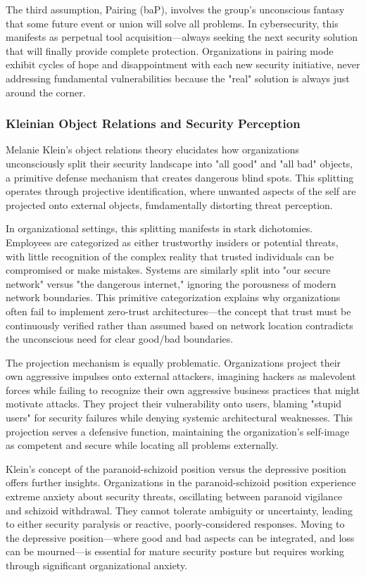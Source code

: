 \documentclass[manuscript,screen,review]{acmart}
\begin{document}
The third assumption, Pairing (baP), involves the group's unconscious fantasy that some future event or union will solve all problems. In cybersecurity, this manifests as perpetual tool acquisition—always seeking the next security solution that will finally provide complete protection. Organizations in pairing mode exhibit cycles of hope and disappointment with each new security initiative, never addressing fundamental vulnerabilities because the "real" solution is always just around the corner.

\subsubsection{Kleinian Object Relations and Security Perception}

Melanie Klein's object relations theory\cite{klein1946} elucidates how organizations unconsciously split their security landscape into "all good" and "all bad" objects, a primitive defense mechanism that creates dangerous blind spots. This splitting operates through projective identification, where unwanted aspects of the self are projected onto external objects, fundamentally distorting threat perception.

In organizational settings, this splitting manifests in stark dichotomies. Employees are categorized as either trustworthy insiders or potential threats, with little recognition of the complex reality that trusted individuals can be compromised or make mistakes. Systems are similarly split into "our secure network" versus "the dangerous internet," ignoring the porousness of modern network boundaries. This primitive categorization explains why organizations often fail to implement zero-trust architectures—the concept that trust must be continuously verified rather than assumed based on network location contradicts the unconscious need for clear good/bad boundaries.

The projection mechanism is equally problematic. Organizations project their own aggressive impulses onto external attackers, imagining hackers as malevolent forces while failing to recognize their own aggressive business practices that might motivate attacks. They project their vulnerability onto users, blaming "stupid users" for security failures while denying systemic architectural weaknesses. This projection serves a defensive function, maintaining the organization's self-image as competent and secure while locating all problems externally.

Klein's concept of the paranoid-schizoid position versus the depressive position offers further insights. Organizations in the paranoid-schizoid position experience extreme anxiety about security threats, oscillating between paranoid vigilance and schizoid withdrawal. They cannot tolerate ambiguity or uncertainty, leading to either security paralysis or reactive, poorly-considered responses. Moving to the depressive position—where good and bad aspects can be integrated, and loss can be mourned—is essential for mature security posture but requires working through significant organizational anxiety.
\end{document}
